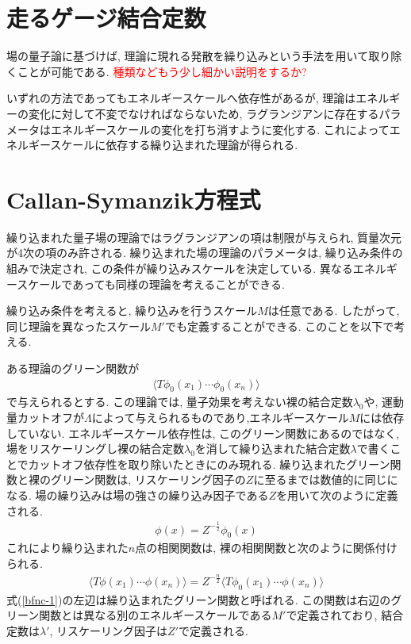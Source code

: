 %
%
\section{走るゲージ結合定数}
場の量子論に基づけば, 理論に現れる発散を繰り込みという手法を用いて取り除くことが可能である.
\textcolor{red}{種類などもう少し細かい説明をするか?}

いずれの方法であってもエネルギースケールへ依存性があるが, 理論はエネルギーの変化に対して不変でなければならないため, ラグランジアンに存在するパラメータはエネルギースケールの変化を打ち消すように変化する.
これによってエネルギースケールに依存する繰り込まれた理論が得られる.
\section{Callan-Symanzik方程式}
繰り込まれた量子場の理論ではラグランジアンの項は制限が与えられ, 質量次元が4次の項のみ許される.
繰り込まれた場の理論のパラメータは, 繰り込み条件の組みで決定され, この条件が繰り込みスケールを決定している.
異なるエネルギースケールであっても同様の理論を考えることができる.

繰り込み条件を考えると, 繰り込みを行うスケール$M$は任意である.
したがって, 同じ理論を異なったスケール$M'$でも定義することができる.
このことを以下で考える. 

ある理論のグリーン関数が
\begin{align}
  \langle T \phi_0(x_1)\cdots\phi_0(x_n)\rangle  \label{rescale1}
\end{align}
で与えられるとする.
この理論では, 量子効果を考えない裸の結合定数$\lambda_0$や, 運動量カットオフが$\Lambda$によって与えられるものであり,エネルギースケール$M$には依存していない.
エネルギースケール依存性は, このグリーン関数にあるのではなく, 場をリスケーリングし裸の結合定数$\lambda_0$を消して繰り込まれた結合定数$\lambda$で書くことでカットオフ依存性を取り除いたときにのみ現れる.
繰り込まれたグリーン関数と裸のグリーン関数は, リスケーリング因子の$Z$に至るまでは数値的に同じになる.
場の繰り込みは場の強さの繰り込み因子である$Z$を用いて次のように定義される.
\begin{align}
  \phi(x) = Z^{-\frac{1}{2}}\phi_0(x) \label{bfnc-2}
\end{align}
これにより繰り込まれた$n$点の相関関数は, 裸の相関関数と次のように関係付けられる.
\begin{align}
  \langle T \phi(x_1)\cdots \phi(x_n)\rangle = Z^{-\frac{n}{2}}\langle T \phi_0(x_1)\cdots \phi(x_n)\rangle \label{bfnc-1}
\end{align}
式(\ref{bfnc-1})の左辺は繰り込まれたグリーン関数と呼ばれる.
この関数は右辺のグリーン関数とは異なる別のエネルギースケールである$M'$で定義されており, 結合定数は$\lambda'$, リスケーリング因子は$Z'$で定義される.

